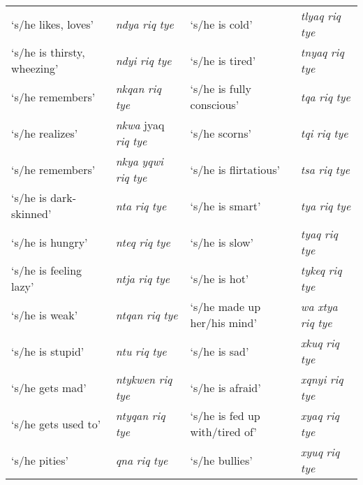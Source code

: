 \documentclass[output=paper]{langsci/langscibook}
\begin{document}
\begin{table}
\begin{tabularx}{\textwidth}{QlQl}
`s/he likes, loves'&\emph{ndya} \emph{riq} \emph{tye}&`s/he is cold'&\emph{tlyaq} \emph{riq} \emph{tye} \\
`s/he is thirsty, wheezing'&\emph{ndyi} \emph{riq} \emph{tye}&`s/he is tired'&\emph{tnyaq} \emph{riq} \emph{tye} \\
`s/he remembers'&\emph{nkqan} \emph{riq} \emph{tye}&`s/he is fully conscious'&\emph{tqa} \emph{riq} \emph{tye} \\
`s/he realizes'&\emph{nkwa} jyaq \emph{riq} \emph{tye} &`s/he scorns'&\emph{tqi} \emph{riq} \emph{tye} \\
`s/he remembers'&\emph{nkya} \emph{yqwi} \emph{riq} \emph{tye}&`s/he is flirtatious'&\emph{tsa} \emph{riq} \emph{tye} \\
`s/he is dark-skinned'&\emph{nta} \emph{riq} \emph{tye}&`s/he is smart'&\emph{tya} \emph{riq} \emph{tye} \\
`s/he is hungry'&\emph{nteq} \emph{riq} \emph{tye}&`s/he is slow'&\emph{tyaq} \emph{riq} \emph{tye} \\
`s/he is feeling lazy'&\emph{ntja} \emph{riq} \emph{tye}&`s/he is hot'&\emph{tykeq} \emph{riq} \emph{tye} \\
`s/he is weak'&\emph{ntqan} \emph{riq} \emph{tye}&`s/he made up her/his mind'&\emph{wa} \emph{xtya} \emph{riq} \emph{tye} \\
`s/he is stupid'&\emph{ntu} \emph{riq} \emph{tye} &`s/he is sad'& \emph{xkuq} \emph{riq} \emph{tye} \\
`s/he gets mad'&\emph{ntykwen} \emph{riq} \emph{tye}&`s/he is afraid'&\emph{xqnyi} \emph{riq} \emph{tye} \\
`s/he gets used to'&\emph{ntyqan} \emph{riq} \emph{tye}&`s/he is fed up with/tired of'&\emph{xyaq} \emph{riq} \emph{tye} \\
`s/he pities'&\emph{qna} \emph{riq} \emph{tye}&`s/he bullies'&\emph{xyuq} \emph{riq} \emph{tye} \\

\end{tabularx}
\end{table}
\end{document}
